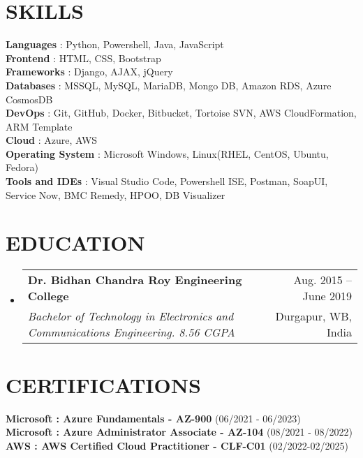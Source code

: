 \documentclass[letterpaper,11pt]{article}
\makeatletter
\newcommand{\resumeSubheading}[4]{
  \vspace{-1pt}\item
    \begin{tabular*}{\textwidth}[t]{l@{\extracolsep{\fill}}r}
      \textbf{#1} & {\color{dark-grey}\small #2}\vspace{1pt}\\ %
      \textit{#3} & {\color{dark-grey} \small #4}\\ %
    \end{tabular*}\vspace{-4pt}
}
\newcommand{\resumeSubHeadingListStart}{\begin{itemize}[leftmargin=0in, label={}]}
\newcommand{\resumeSubHeadingListEnd}{\end{itemize}}
\makeatother
\begin{document}
\section{SKILLS}
 \begin{itemize}[leftmargin=0in, label={}]
    \small{\item{
    \textbf{Languages} {: Python, Powershell, Java, JavaScript}\vspace{2pt} \\
    \textbf{Frontend} {: HTML, CSS, Bootstrap}\vspace{2pt} \\
    \textbf{Frameworks} {: Django, AJAX, jQuery}\vspace{2pt} \\
    \textbf{Databases} {: MSSQL, MySQL, MariaDB, Mongo DB, Amazon RDS, Azure CosmosDB}\vspace{2pt} \\
    \textbf{DevOps} {: Git, GitHub, Docker, Bitbucket, Tortoise SVN, AWS CloudFormation, ARM Template}\vspace{2pt} \\
    \textbf{Cloud}     {: Azure, AWS}\vspace{2pt} \\
    \textbf{Operating System} {: Microsoft Windows, Linux(RHEL, CentOS, Ubuntu, Fedora)}\vspace{2pt} \\
    \textbf{Tools and IDEs} {: Visual Studio Code, Powershell ISE, Postman, SoapUI, Service Now, BMC Remedy, HPOO, DB Visualizer}\vspace{2pt} \\}
    }
 \end{itemize}
 

\section {EDUCATION}
  \resumeSubHeadingListStart
    \resumeSubheading
      {Dr. Bidhan Chandra Roy Engineering College}{Aug. 2015 -- June 2019}
      {Bachelor of Technology in Electronics and Communications Engineering. 8.56 CGPA}{Durgapur, WB, India}
  \resumeSubHeadingListEnd



\section{CERTIFICATIONS}
 \begin{itemize}[leftmargin=0in, label={}]
    \small{\item{
    \textbf{Microsoft : Azure Fundamentals - AZ-900} {(06/2021 - 06/2023)}\vspace{2pt} \\
    \textbf{Microsoft : Azure Administrator Associate - AZ-104} {(08/2021 - 08/2022)}\vspace{2pt} \\
    \textbf{AWS : AWS Certified Cloud Practitioner - CLF-C01} {(02/2022-02/2025)}\vspace{2pt} \\
    }
    }
 \end{itemize}
 
\end{document}
